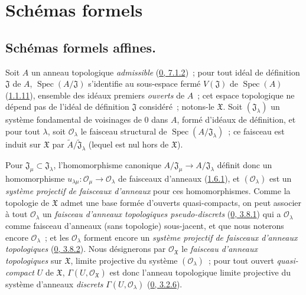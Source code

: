 \section{Schémas formels}
\label{section:I.10-fr}

\subsection{Schémas formels affines.}
\label{subsection:I.10.1-fr}

\begin{env}[10.1.1]
\label{I.10.1.1-fr}
Soit $A$ un anneau topologique \emph{admissible}
(\hyperref[0.7.1.2-fr]{0, 7.1.2})~; pour tout idéal de définition
$\mathfrak{J}$ de $A$, $\operatorname{Spec}(A/\mathfrak{J})$ s'identifie
au sous-espace fermé $V(\mathfrak{J})$ de $\operatorname{Spec}(A)$
(\hyperref[I.1.1.11-fr]{1.1.11}), ensemble des idéaux premiers
\emph{ouverts} de $A$~; cet espace topologique ne dépend pas de
l'idéal de définition $\mathfrak{J}$ considéré~; notons-le
$\mathfrak{X}$. Soit $(\mathfrak{J}_\lambda)$ un système fondamental de
voisinages de 0 dans $A$, formé d'idéaux de définition, et pour tout
$\lambda$, soit $\mathscr{O}_\lambda$ le faisceau structural de
$\operatorname{Spec}(A/\mathfrak{J}_\lambda)$~; ce faisceau est induit sur
$\mathfrak{X}$ par
$\widetilde{A}/\widetilde{\mathfrak{J}}_\lambda$ (lequel est nul hors de
$\mathfrak{X}$).

Pour $\mathfrak{J}_\mu\subset\mathfrak{J}_\lambda$, l'homomorphisme
canonique $A/\mathfrak{J}_\mu\to A/\mathfrak{J}_\lambda$ définit donc un
homomorphisme
$u_{\lambda\mu}:\mathscr{O}_\mu\to\mathscr{O}_\lambda$ de faisceaux
d'anneaux (\hyperref[I.1.6.1-fr]{1.6.1}), et
$(\mathscr{O}_\lambda)$ est un \emph{système projectif de faisceaux
d'anneaux} pour ces homomorphismes. Comme la topologie de $\mathfrak{X}$
admet une base formée d'ouverts quasi-compacts, on peut associer à tout
$\mathscr{O}_\lambda$ un \emph{faisceau d'anneaux topologiques
pseudo-discrets} (\hyperref[0.3.8.1-fr]{0, 3.8.1}) qui a
$\mathscr{O}_\lambda$ comme faisceau d'anneaux (sans topologie) sous-jacent,
et que nous noterons encore $\mathscr{O}_\lambda$~; et les
$\mathscr{O}_\lambda$ forment encore un \emph{système projectif de faisceaux
d'anneaux topologiques} (\hyperref[0.3.8.2-fr]{0, 3.8.2}). Nous désignerons
par $\mathscr{O}_{\mathfrak{X}}$ le \emph{faisceau d'anneaux topologiques}
sur $\mathfrak{X}$, limite projective du système
$(\mathscr{O}_\lambda)$~; pour tout ouvert \emph{quasi-compact} $U$ de
$\mathfrak{X}$, $\Gamma(U,\mathscr{O}_{\mathfrak{X}})$ est donc l'anneau
topologique limite projective du système d'anneaux \emph{discrets}
$\Gamma(U,\mathscr{O}_\lambda)$
(\hyperref[0.3.2.6-fr]{0, 3.2.6}).
\end{env}

